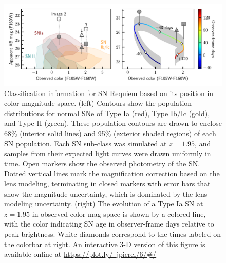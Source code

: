 \documentclass[12pt,dvipsnames]{article}
\def\SNABC{SN Requiem\xspace}
\begin{document}
\begin{figure}[h]
    \centering
    \includegraphics[width=\textwidth]{Paper/Figures/classification_contours_timeline.pdf}
    \caption{Classification information for \SNABC based on its position in color-magnitude space. (left) Contours show the population distributions for normal SNe of Type Ia (red), Type Ib/Ic (gold), and Type II (green).  These population contours are drawn to enclose 68\% (interior solid lines) and 95\% (exterior shaded regions) of each SN population.  Each SN sub-class was simulated at $z=1.95$, and samples from their expected light curves were drawn uniformly in time. Open markers show the observed photometry of the SN. Dotted vertical lines mark the magnification correction based on the lens modeling, terminating in closed markers with error bars that show the magnitude uncertainty, which is dominated by the lens modeling uncertainty.  (right) The evolution of a Type Ia SN at $z=1.95$ in observed color-mag space is shown by a colored line, with the color indicating SN age in observer-frame days relative to peak brightness.  White diamonds correspond to the times labeled on the colorbar at right. An interactive 3-D version of this figure is available online at \href{https://plot.ly/~jpierel/6/#/}{https://plot.ly/~jpierel/6/#/}
    \label{fig:class}
    }
\end{figure}
\end{document}
